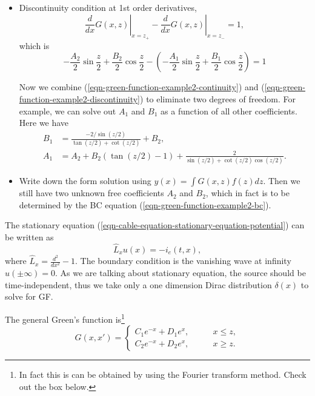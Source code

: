 \documentclass{tufte-handout}
\begin{document}
\begin{framed}
\begin{itemize}
\item Discontinuity condition at 1st order derivatives,
\begin{equation*}
    \left.\frac{d}{dx} G(x,z)  \right\vert_{x=z_+} - \left.\frac{d}{dx} G(x,z)  \right\vert_{x=z_-} = 1, 
\end{equation*}
which is
\begin{equation}
    -\frac{A_2}{2}\sin\frac{z}{2} + \frac{B_2}{2} \cos\frac{z}{2} - \left( -\frac{A_1}{2}\sin\frac{z}{2} + \frac{B_1}{2}\cos\frac{z}{2} \right) = 1
    \label{eqn-green-function-example2-discontinuity}
\end{equation}

Now we combine (\ref{eqn-green-function-example2-continuity}) and (\ref{eqn-green-function-example2-discontinuity}) to eliminate two degrees of freedom. For example, we can solve out $A_1$ and $B_1$ as a function of all other coefficients. Here we have
\begin{align*}
    B_1 &= \frac{ - 2/\sin(z/2) }{\tan(z/2) + \cot(z/2)} + B_2 , \\
    A_1 &= A_2 + B_2(\tan(z/2)-1) + \frac{2}{\sin(z/2) + \cot(z/2)\cos(z/2)}.
\end{align*}

\item Write down the form solution using $y(x) = \int G(x,z) f(z) dz$. Then we still have two unknown free coefficients $A_2$ and $B_2$, which in fact is to be determined by the BC equation (\ref{eqn-green-function-example2-bc}).

\end{itemize}


\end{framed}



The stationary equation (\ref{eqn-cable-equation-stationary-equation-potential}) can be written as
\begin{equation}
    \hat L_x u(x) = - i_e(t,x),
\end{equation}
where $\hat L_x = \frac{d^2}{dx^2} -1$. The boundary condition is the vanishing wave at infinity $u(\pm\infty)=0$. As we are talking about stationary equation, the source should be time-independent, thus we take only a one dimension Dirac distribution $\delta(x)$ to solve for GF.

The general Green's function is\footnote{In fact this is can be obtained by using the Fourier transform method. Check out the box below.}
\begin{equation*}
G(x,x') = \begin{cases}
C_1 e^{-x} + D_1 e^{x}, & \qquad x\leq z,\\
C_2 e^{-x} + D_2 e^{x}, & \qquad x\geq z.
\end{cases}
\end{equation*}
\end{document}

